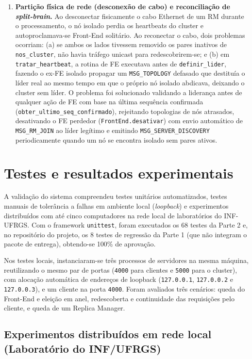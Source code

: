 \documentclass[12pt,a4paper]{article}
\newcommand{\arquivo}[1]{\texttt{#1}}
\newcommand{\mensagem}[1]{\texttt{#1}}
\begin{document}
\begin{enumerate}[label=\arabic*.]
    \item \textbf{Partição física de rede (desconexão de cabo) e reconciliação de \textit{split-brain}.} Ao desconectar fisicamente o cabo Ethernet de um RM durante o processamento, o nó isolado perdia os heartbeats do cluster e autoproclamava-se Front-End solitário. Ao reconectar o cabo, dois problemas ocorriam: (a) se ambos os lados tivessem removido os pares inativos de \arquivo{nos\_cluster}, não havia tráfego unicast para redescobrirem-se; e (b) em \arquivo{tratar\_heartbeat}, a rotina de FE executava antes de \arquivo{definir\_lider}, fazendo o ex-FE isolado propagar um \mensagem{MSG\_TOPOLOGY} defasado que destituía o líder real ao mesmo tempo em que o próprio nó isolado abdicava, deixando o cluster sem líder. O problema foi solucionado validando a liderança antes de qualquer ação de FE com base na última sequência confirmada (\arquivo{obter\_ultimo\_seq\_confirmado}), rejeitando topologias de nós atrasados, desativando o FE perdedor (\arquivo{FrontEnd.desativar}) com envio automático de \mensagem{MSG\_RM\_JOIN} ao líder legítimo e emitindo \mensagem{MSG\_SERVER\_DISCOVERY} periodicamente quando um nó se encontra isolado sem pares ativos.
\end{enumerate}

\section{Testes e resultados experimentais}

A validação do sistema compreendeu testes unitários automatizados, testes manuais de tolerância a falhas em ambiente local (\textit{loopback}) e experimentos distribuídos com até cinco computadores na rede local de laboratórios do INF-UFRGS. Com o framework \arquivo{unittest}, foram executados os 68 testes da Parte 2 e, no repositório do projeto, os 8 testes de regressão da Parte 1 (que não integram o pacote de entrega), obtendo-se 100\% de aprovação.

Nos testes locais, instanciaram-se três processos de servidores na mesma máquina, reutilizando o mesmo par de portas (\texttt{4000} para clientes e \texttt{5000} para o cluster), com alocação automática de endereços de loopback (\texttt{127.0.0.1}, \texttt{127.0.0.2} e \texttt{127.0.0.3}), e um cliente na porta \texttt{4000}. Foram avaliados três cenários: queda do Front-End e eleição em anel, redescoberta e continuidade das requisições pelo cliente, e queda de um Replica Manager.

\subsection{Experimentos distribuídos em rede local (Laboratório do INF/UFRGS)}
\end{document}
